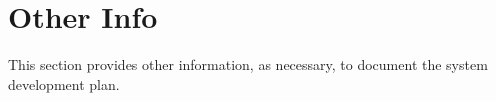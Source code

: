 
\chapter{Other Info}
\label{loc:OtherInfo}


This section provides other information, as necessary, to document the system development plan.